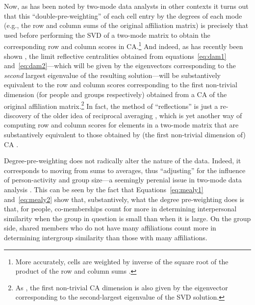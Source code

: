 \documentclass[a4paper,fleqn]{cas-sc}
\begin{document}
Now, as has been noted by two-mode data analysts in other contexts \citep[e.g.,][]{faust2005using} it turns out that this ``double-pre-weighting'' of each cell entry by the degrees of each mode (e.g., the row and column sums of the original affiliation matrix) is precisely that used before performing the SVD of a two-mode matrix to obtain the corresponding row and column scores in CA.\footnote{More accurately, cells are weighted by inverse of the square root of the product of the row and column sums \citep[e.g.,][124]{faust2005using}.} And indeed, as has recently been shown \citep{van2021correspondence}, the limit reflective centralities obtained from equations~\ref{eq:dam1} and~\ref{eq:dam2}---which will be given by the eigenvectors corresponding to the \textit{second} largest eigenvalue of the resulting solution---will be substantively equivalent to the row and column scores corresponding to the first non-trivial dimension (for people and groups respectively) obtained from a CA of the original affiliation matrix.\footnote{As \citet[126]{faust2005using}, the first non-trivial CA dimension is also given by the eigenvector corresponding to the second-largest eigenvalue of the SVD solution.} In fact, the method of ``reflections'' is just a re-discovery of the older idea of reciprocal averaging \citep{hill1973reciprocal}, which is yet another way of computing row and column scores for elements in a two-mode matrix that are substantively equivalent to those obtained by (the first non-trivial dimension of) CA \citep{mealy2019interpreting}.

Degree-pre-weighting does not radically alter the nature of the data. Indeed, it corresponds to moving from sums to averages, thus ``adjusting'' for the influence of person-activity and group size---a seemingly perenial issue in two-mode data analysis \citep[159ff]{bonacich1991simultaneous}. This can be seen by the fact that Equations~\ref{eq:mealy1} and~\ref{eq:mealy2} show that, substantively, what the degree pre-weighting does is that, for people, co-memberships count for more in determining interpersonal similarity when the group in question is small than when it is large. On the group side, shared members who do not have many affiliations count more in determining intergroup similarity than those with many affiliations. 
\end{document}
